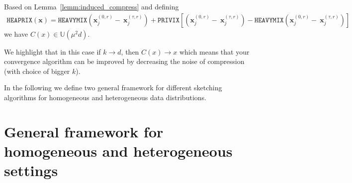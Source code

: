 \begin{corollary}
Based on Lemma~\ref{lemm:induced_compress} and defining 
\begin{align}
    \texttt{HEAPRIX}(\boldsymbol{x})=\texttt{HEAVYMIX}\left(\boldsymbol{x}_j^{(0,r)}-~{\boldsymbol{x}}_{j}^{(\tau,r)}\right)+\texttt{PRIVIX}\left[\left(\boldsymbol{x}_j^{(0,r)}-~{\boldsymbol{x}}_{j}^{(\tau,r)}\right)-\texttt{HEAVYMIX}\left(\boldsymbol{x}_j^{(0,r)}-~{\boldsymbol{x}}_{j}^{(\tau,r)}\right)\right]
\end{align}
we have $C(x)\in \mathbb{U}(\mu^2 d)$.
\end{corollary}
\begin{remark}
We highlight that in this case if $k\rightarrow d$, then $C(x)\rightarrow x$ which means that your convergence algorithm can be improved by decreasing the noise of compression (with choice of bigger $k$). 
\end{remark}

In the following we define two general framework for different sketching algorithms for homogeneous and heterogeneous data distributions.
\section{General framework for homogeneous and heterogeneous settings}

